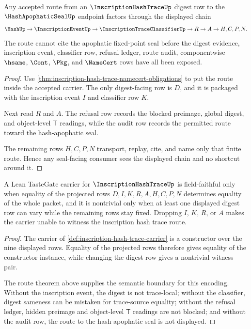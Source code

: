 \begin{theorem}
\label{thm:inscription-hash-trace-audit-route}
Any accepted route from an $\InscriptionHashTraceUp$ digest row to the $\HashApophaticSealUp$ endpoint factors through the displayed chain
$$
\HashUp \to \InscriptionEventUp \to \InscriptionTraceClassifierUp \to R \to A \to H,C,P,N.
$$
The route cannot cite the apophatic fixed-point seal before the digest evidence, inscription event, classifier row, refusal ledger, route audit, componentwise $\hsame$, $\Cont$, $\Pkg$, and $\NameCert$ rows have all been exposed.
\end{theorem}
\begin{proof}
Use \autoref{thm:inscription-hash-trace-namecert-obligations} to put the route inside the accepted carrier. The only digest-facing row is $D$, and it is packaged with the inscription event $I$ and classifier row $K$.

Next read $R$ and $A$. The refusal row records the blocked preimage, global digest, and object-level $\mathsf{T}$ readings, while the audit row records the permitted route toward the hash-apophatic seal.

The remaining rows $H,C,P,N$ transport, replay, cite, and name only that finite route. Hence any seal-facing consumer sees the displayed chain and no shortcut around it.
\end{proof}

\begin{theorem}
\label{thm:inscription-hash-trace-fieldfaithful-prediction}
A Lean TasteGate carrier for $\InscriptionHashTraceUp$ is field-faithful only when equality of the projected rows $D,I,K,R,A,H,C,P,N$ determines equality of the whole packet, and it is nontrivial only when at least one displayed digest row can vary while the remaining rows stay fixed. Dropping $I$, $K$, $R$, or $A$ makes the carrier unable to witness the inscription hash trace route.
\end{theorem}
\begin{proof}
The carrier of \autoref{def:inscription-hash-trace-carrier} is a constructor over the nine displayed rows. Equality of the projected rows therefore gives equality of the constructor instance, while changing the digest row gives a nontrivial witness pair.

The route theorem above supplies the semantic boundary for this encoding. Without the inscription event, the digest is not trace-local; without the classifier, digest sameness can be mistaken for trace-source equality; without the refusal ledger, hidden preimage and object-level $\mathsf{T}$ readings are not blocked; and without the audit row, the route to the hash-apophatic seal is not displayed.
\end{proof}

